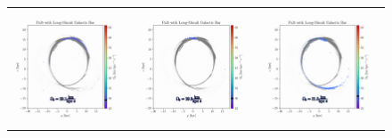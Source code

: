 \begin{figure}
\begin{tabular}{ccc}
                    \includegraphics[width=.32\linewidth]{images/frame_0016.png}&
                    \includegraphics[width=.32\linewidth]{images/frame_0019.png}&
                    \includegraphics[width=.32\linewidth]{images/frame_0023.png}\\
                    

\end{tabular}
\end{figure}
